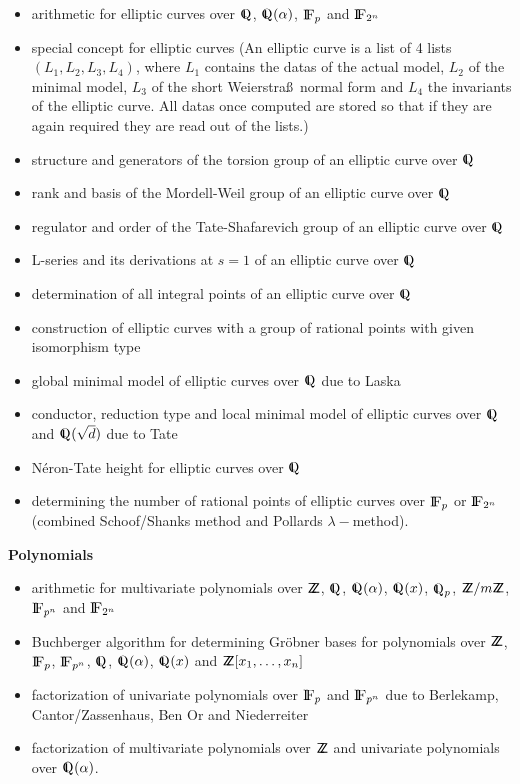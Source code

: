 \begin{itemize}
\item arithmetic for elliptic curves over $\Q$, $\Q(\alpha)$, ${\rm{I\!F}}_p$ and ${\rm{I\!F}}_{2^n}$
\item special concept for elliptic curves (An elliptic curve is a list
of 4 lists $(L_1, L_2, L_3, L_4)$, where $L_1$ contains the datas of the
actual model, $L_2$ of the minimal model, $L_3$ of the short Weierstra\ss ~normal form
and $L_4$ the invariants of the elliptic curve. All datas once computed
are stored so that if they are again required they are read out of the
lists.)
\item structure and generators of the torsion group of an elliptic curve over $\Q$ 
\item rank and basis of the Mordell-Weil group of an elliptic curve over $\Q$ 
\item regulator and order of the Tate-Shafarevich group of an elliptic curve over $\Q$ 
\item L-series and its derivations at $s=1$ of an elliptic curve over $\Q$
\item determination of all integral points of an elliptic curve over $\Q$ 
\item construction of elliptic curves with a group of rational points with given isomorphism type
\item global minimal model of elliptic curves over $\Q$ due to Laska
\item conductor, reduction type and local minimal model of elliptic curves over $\Q$
	and $\Q(\sqrt{d})$ due to Tate
\item N\'eron-Tate height for elliptic curves over $\Q$
\item determining the number of rational points of elliptic curves over 
	${\rm{I\!F}}_p$ or ${\rm{I\!F}}_{2^n}$ (combined Schoof/Shanks method and Pollards
	$\lambda-$method).
\end{itemize}

\vspace{0.4cm}

\begin{center}
{\large {\bf Polynomials}}
\end{center}

\begin{itemize}
\item arithmetic for multivariate polynomials over ${{\sf Z}\hspace{-1.3mm}{\sf Z}}$, $\Q$, $\Q(\alpha)$,
$\Q(x)$, $\Q_p$, ${{\sf Z}\hspace{-1.3mm}{\sf Z}}/m{{\sf Z}\hspace{-1.3mm}{\sf Z}}$, ${\rm{I\!F}}_{p^n}$ and ${\rm{I\!F}}_{2^n}$
\item Buchberger algorithm for determining Gr\"obner bases 
      for polynomials over ${{\sf Z}\hspace{-1.3mm}{\sf Z}}$, ${\rm{I\!F}}_p$, ${\rm{I\!F}}_{p^n}$, $\Q$,
	$\Q(\alpha)$, $\Q(x)$ and ${{\sf Z}\hspace{-1.3mm}{\sf Z}}[x_1, \ldots, x_n]$
\item factorization of univariate polynomials over ${\rm{I\!F}}_p$
	and ${\rm{I\!F}}_{p^n}$ due to Berlekamp, Cantor/Zassen\-haus, Ben Or and
	Niederreiter
\item factorization of multivariate polynomials over ${{\sf Z}\hspace{-1.3mm}{\sf Z}}$ and univariate
polynomials over $\Q(\alpha)$.
\end{itemize}

